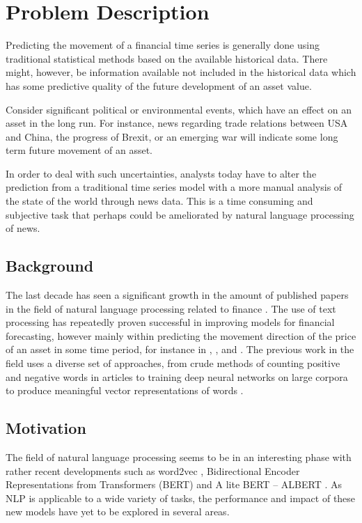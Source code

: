 \chapter{Problem Description}

Predicting the movement of a financial time series is generally done using traditional statistical methods based on the available historical data. There might, however, be information available not included in the historical data which has some predictive quality of the future development of an asset value. 

Consider significant political or environmental events, which have an effect on an asset in the long run. For instance, news regarding trade relations between USA and China, the progress of Brexit, or an emerging war will indicate some long term future movement of an asset. 

In order to deal with such uncertainties, analysts today have to alter the prediction from a traditional time series model with a more manual analysis of the state of the world through news data. This is a time consuming and subjective task that perhaps could be ameliorated by natural language processing of news.

\section{Background}

The last decade has seen a significant growth in the amount of published papers in the field of natural language processing related to finance \citep{xing}. The use of text processing has repeatedly proven successful in improving models for financial forecasting, however mainly within predicting the movement direction of the price of an asset in some time period, for instance in \citet{li2014news}, \citet{heston2017news}, and \citet{othan}. The previous work in the field uses a diverse set of approaches, from crude methods of counting positive and negative words in articles to training deep neural networks on large corpora to produce meaningful vector representations of words \citep{arorausing}. 


\section{Motivation}
The field of natural language processing seems to be in an interesting phase with rather recent developments such as word2vec \citep{mikolov2013efficient}, Bidirectional Encoder Representations from Transformers (BERT) \citep{devlin2018bert} and A lite BERT -- ALBERT \citep{lan2019albert}. As NLP is applicable to a wide variety of tasks, the performance and impact of these new models have yet to be explored in several areas. 

